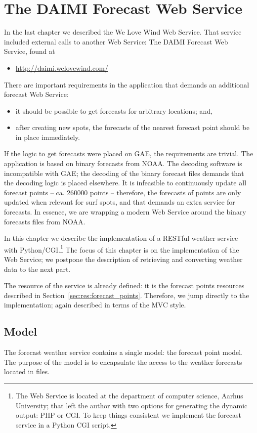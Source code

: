 \chapter{The DAIMI Forecast Web Service}\label{chap:ws_daimi}
In the last chapter we described the We Love Wind Web Service. That service
included external calls to another Web Service: The DAIMI Forecast Web Service, found
at
\begin{itemize}
  \item \url{http://daimi.welovewind.com/}
\end{itemize}
There are important requirements in the application that demands an additional
forecast Web Service:
\begin{itemize}
  \item it should be possible to get forecasts for arbitrary locations; and,
  \item after creating new spots, the forecasts of the nearest forecast point
  should be in place immediately. 
\end{itemize}
If the logic to get forecasts were placed on GAE, the requirements are
trivial. The application is based on binary forecasts from NOAA. The decoding
software is incompatible with GAE; the decoding of the binary forecast files
demands that the decoding logic is placed elsewhere. It is infeasible to
continuously update all forecast points -- ca. 260000 points -- therefore, the
forecasts of points are only updated when relevant for surf spots, and that
demands an extra service for forecasts. In essence, we are wrapping a modern Web
Service around the binary forecasts files from NOAA.

In this chapter we describe the implementation of a RESTful weather service with
Python/CGI.\footnote{The Web Service is located at the department of computer
science, Aarhus University; that left the author with two options for generating
the dynamic output: PHP or CGI. To keep things consistent we implement the
forecast service in a Python CGI script.} The focus of this chapter is on the
implementation of the Web Service; we postpone the description of retrieving and
converting weather data to the next part.

The resource of the service is already defined: it is the forecast points
resources described in Section~\vref{sec:res:forecast_points}. Therefore, we jump
directly to the implementation; again described in terms of the MVC style.

\section{Model}
The forecast weather service contains a single model: the forecast point
model. The purpose of the model is to encapsulate the access to the weather
forecasts located in files. 

